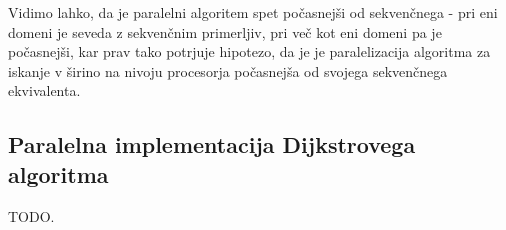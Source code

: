 \documentclass[mat1, tisk]{fmfdelo}
\begin{document}
Vidimo lahko, da je paralelni algoritem spet počasnejši od sekvenčnega - pri eni domeni je seveda z sekvenčnim primerljiv,
pri več kot eni domeni pa je počasnejši, kar prav tako potrjuje hipotezo, da je je paralelizacija algoritma za iskanje
v širino na nivoju procesorja počasnejša od svojega sekvenčnega ekvivalenta.


\subsection{Paralelna implementacija Dijkstrovega algoritma} \label{section:dijkstra}

TODO.
\end{document}
